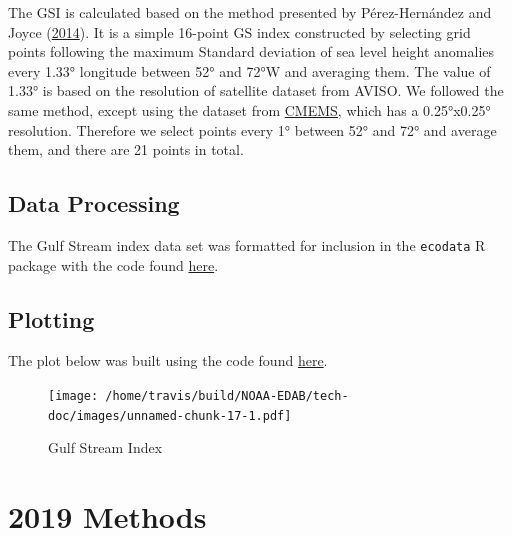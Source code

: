 \documentclass[
]{book}
\begin{document}
The GSI is calculated based on the method presented by Pérez-Hernández and Joyce (\protect\hyperlink{ref-perez-hernandez2014}{2014}). It is a simple 16-point GS index constructed by selecting grid points following the maximum Standard deviation of sea level height anomalies every 1.33° longitude between 52° and 72°W and averaging them. The value of 1.33° is based on the resolution of satellite dataset from AVISO. We followed the same method, except using the dataset from \href{http://marine.copernicus.eu/services-portfolio/access-to-products/?option=com_csw\&view=details\&product_id=SEALEVEL_GLO_PHY_L4_REP_OBSERVATIONS_008_047}{CMEMS}, which has a 0.25°x0.25° resolution. Therefore we select points every 1° between 52° and 72° and average them, and there are 21 points in total.

\hypertarget{data-processing-12}{%
\subsection{Data Processing}\label{data-processing-12}}

The Gulf Stream index data set was formatted for inclusion in the \texttt{ecodata} R package with the code found \href{https://github.com/NOAA-EDAB/ecodata/blob/master/data-raw/get_gsi.R}{here}.

\hypertarget{plotting-10}{%
\subsection{Plotting}\label{plotting-10}}

The plot below was built using the code found
\href{https://github.com/NOAA-EDAB/ecodata/blob/master/chunk-scripts/LTL.Rmd-GSI.R}{here}.

\begin{figure}
\centering
\texttt{[image: /home/travis/build/NOAA-EDAB/tech-doc/images/unnamed-chunk-17-1.pdf]}
\caption{\label{fig:unnamed-chunk-17}Gulf Stream Index}
\end{figure}

\hypertarget{methods-17}{%
\section{2019 Methods}\label{methods-17}}
\end{document}
